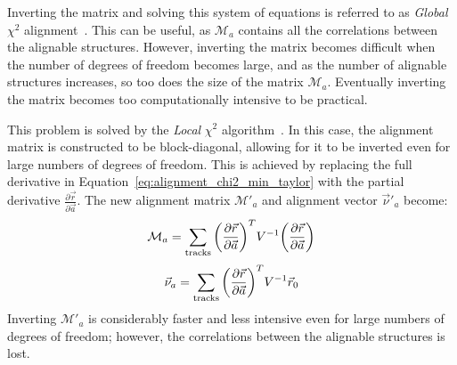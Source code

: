 Inverting the matrix and solving this system of equations is referred to as \emph{Global} $\chi^2$ alignment~\cite{2005.global-chi2-alignment}.
This can be useful, as $\mathcal{M}_a$ contains all the correlations between the alignable structures.
However, inverting the matrix becomes difficult when the number of degrees of freedom becomes large, and
as the number of alignable structures increases, so too does the size of the matrix $\mathcal{M}_a$.
Eventually inverting the matrix becomes too computationally intensive to be practical.

This problem is solved by the \emph{Local} $\chi^2$ algorithm~\cite{2005.local-chi2-thesis}.
In this case, the alignment matrix is constructed to be block-diagonal, allowing for it to be inverted even for large numbers of degrees of freedom.
This is achieved by replacing the full derivative in Equation~\ref{eq:alignment_chi2_min_taylor} with the partial derivative $\frac{\partial\vec{r}}{\partial\vec{a}}$.
The new alignment matrix $\mathcal{M}'_{a}$ and alignment vector $\vec{\nu}'_a$ become:
\begin{equation}
  \mathcal{M}_a = \sum\limits_{\textrm{tracks}}\bigg(\pderiv{\vec{r}}{\vec{a}}\bigg)^{T}V^{-1}\bigg(\pderiv{\vec{r}}{\vec{a}}\bigg)
  \label{eq:alignment_matrix_local}
\end{equation}
\begin{equation}
  \vec{\nu}_a = \sum\limits_{\textrm{tracks}}\bigg(\pderiv{\vec{r}}{\vec{a}}\bigg)^{T}V^{-1}\vec{r}_0
  \label{eq:alignment_vector_local}
\end{equation}
Inverting $\mathcal{M}'_{a}$ is considerably faster and less intensive even for large numbers of degrees of freedom; however, the correlations between the alignable structures is lost.

